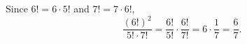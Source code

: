 Since $6!=6\cdot5!$ and $7!=7\cdot6!$,
\[
\dfrac{(6!)^2}{5!\cdot7!}=\dfrac{6!}{5!}\cdot\dfrac{6!}{7!}=6\cdot\dfrac{1}{7}=\boxed{\dfrac{6}{7}}.
\]
